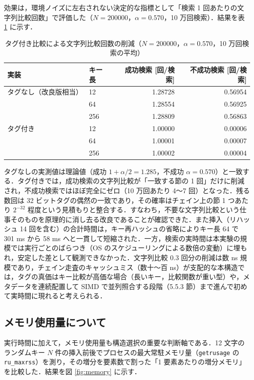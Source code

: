 効果は，環境ノイズに左右されない決定的な指標として「検索 1 回あたりの文字列比較回数」で評価した（$N=200000$，$\alpha = 0.570$，10 万回検索）．結果を表 \ref{tab:tag} に示す．

\begin{table}[htbp]
\centering
\caption{タグ付き比較による文字列比較回数の削減（$N=200000$，$\alpha=0.570$，10 万回検索の平均）}
\label{tab:tag}
\begin{tabular}{llrr}
\hline
実装 & キー長 & 成功検索 [回/検索] & 不成功検索 [回/検索] \\
\hline
タグなし（改良版相当） & 12  & 1.28728 & 0.56954 \\
                       & 64  & 1.28554 & 0.56925 \\
                       & 256 & 1.28809 & 0.56863 \\
タグ付き               & 12  & 1.00000 & 0.00006 \\
                       & 64  & 1.00001 & 0.00007 \\
                       & 256 & 1.00002 & 0.00004 \\
\hline
\end{tabular}
\end{table}

タグなしの実測値は理論値（成功 $1+\alpha/2 = 1.285$，不成功 $\alpha = 0.570$）と一致する．タグ付きでは，成功検索の文字列比較が「一致する節の 1 回」だけに削減され，不成功検索ではほぼ完全にゼロ（10 万回あたり 4〜7 回）となった．残る数回は 32 ビットタグの偶然の一致であり，その確率はチェイン上の節 1 つあたり $2^{-32}$ 程度という見積もりと整合する．すなわち，不要な文字列比較という仕事そのものを原理的に消し去る改良であることが確認できた．また挿入（リハッシュ 14 回を含む）の合計時間は，キー再ハッシュの省略によりキー長 64 で 301 ms から 58 ms へと一貫して短縮された．一方，検索の実時間は本実験の規模では実行ごとのばらつき（OS のスケジューリングによる数倍の変動）に埋もれ，安定した差として観測できなかった．文字列比較 0.3 回分の削減は数 ns 規模であり，チェイン走査のキャッシュミス（数十〜百 ns）が支配的な本構造では，タグの真価はキー比較が高価な場合（長いキー，比較関数が重い型）や，メタデータを連続配置して SIMD で並列照合する段階（5.5.3 節）まで進んで初めて実時間に現れると考えられる．

\subsection{メモリ使用量について}

実行時間に加えて，メモリ使用量も構造選択の重要な判断軸である．12 文字のランダムキー $N$ 件の挿入前後でプロセスの最大常駐メモリ量（{\tt getrusage} の {\tt ru\_maxrss}）を測り，その増分を要素数で割った「1 要素あたりの増分メモリ」を比較した．結果を図 \ref{fig:memory} に示す．

